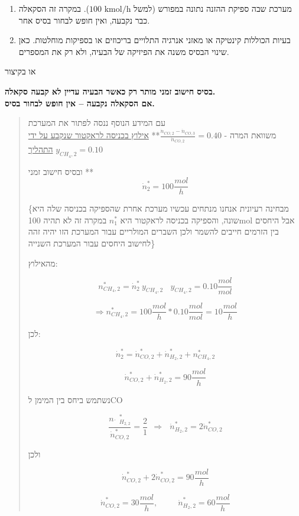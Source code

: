 \documentclass[
  hebrew,
  letterpaper,
  DIV=11,
  numbers=noendperiod]{scrreprt}
\begin{document}
\begin{enumerate}
\def\labelenumi{\arabic{enumi}.}
\item
  מערכת שבה ספיקת ההזנה נתונה במפורש (למשל \(100\text{ kmol/h}\)). במקרה
  זה הסקאלה כבר נקבעה, ואין חופש לבחור בסיס אחר.
\item
  בעיות הכוללות קינטיקה או מאזני אנרגיה התלויים בריכוזים או בספיקות
  מוחלטות. כאן שינוי הבסיס משנה את הפיזיקה של הבעיה, ולא רק את המספרים.
\end{enumerate}

או בקיצור

\textbf{בסיס חישוב זמני מותר רק כאשר הבעיה עדיין לא קבעה סקאלה.\\
אם הסקאלה נקבעה -- אין חופש לבחור בסיס.}

\begin{quote}
עם המידע הנוסף ננסה לפתור את המערכת\\
משוואת המרה -
\(\frac{{\dot{n}}_{CO,2} - {\dot{n}}_{CO,3}}{{\dot{n}}_{CO,2}} = 0.40\)**
\ul{אילוץ בכניסה לראקטור שנקבע על ידי התהליך} \(y_{CH_{4},2} = 0.10\)

ובסיס חישוב זמני ** \[{\dot{n}}_{2}^{*} = 100\frac{mol}{h}\]

\{מבחינה רעיונית אנחנו מנתחים עכשיו מערכת אחרת שהספיקה בכניסה שלה היא
שונה, והספיקה בכניסה לראקטור היא \(n_{1}^{*}\) במקרה זה לא תהיה 100mol
אבל היחסים בין הזרמים חייבים להשמר ולכן השברים המולריים עבור המערכת הזו
יהיה זהה לחישוב היחסים עבור המערכת השנייה\}

מהאילוץ:

\[n_{CH_{4},2}^{*} = {\dot{n}}_{2}^{*}{\ y}_{CH_{4},2}\ \ \ \ y_{CH_{4},2} = 0.10\frac{mol}{mol}\]

\[\Rightarrow n_{CH_{4},2}^{*} = 100\frac{mol}{h}*0.10\frac{mol}{mol} = 10\frac{mol}{h}\]

לכן:

\[{\dot{n}}_{2}^{*} = {\dot{n}}_{CO,2}^{*} + {\dot{n}}_{H_{2},2}^{*} + n_{CH_{4},2}^{*}\]

\[{\dot{n}}_{CO,2}^{*} + {\dot{n}}_{H_{2},2}^{*} = 90\frac{mol}{h}\]

נשתמש ביחס בין המימן לCO

\[\frac{n{\dot{\text{ }}}_{H_{2,2}}^{*}}{{\dot{n}}_{CO,2}^{*}} = \frac{2}{1}\ \  \Longrightarrow \ \ \ {\dot{n}}_{H_{2},2}^{*} = 2{\dot{n}}_{CO,2}^{*}\]

ולכן

\[{\dot{n}}_{CO,2}^{*} + 2{\dot{n}}_{CO,2}^{*} = 90\frac{mol}{h}\]

\[{\dot{n}}_{CO,2}^{*} = 30\frac{mol}{h},\ \ \ \ \ \ \ \ \ \ \ {\dot{n}}_{H_{2},2}^{*} = 60\frac{mol}{h}\]


\end{quote}
\end{document}
